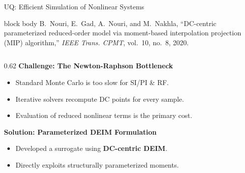 

\begin{frame}[t]{UQ: Efficient Simulation of Nonlinear Systems}
	\vspace{1ex}

	\begin{beamercolorbox}[wd=\textwidth, sep=1ex, rounded=true]{block body}
		\scriptsize B.~Nouri, E.~Gad, A.~Nouri, and M.~Nakhla, ``DC-centric parameterized reduced-order model via moment-based interpolation projection (MIP) algorithm,'' \emph{IEEE Trans. CPMT}, vol.~10, no.~8, 2020.
	\end{beamercolorbox}

	\vspace{2ex}

	\begin{columns}[T, onlytextwidth]
		\begin{column}{0.62\textwidth}
			\small
			\textbf{\textcolor{blue!80!black}{Challenge: The Newton-Raphson Bottleneck}}
			\begin{itemize}
				\item Standard Monte Carlo is too slow for SI/PI \& RF.
				\item Iterative solvers recompute DC points for every sample.
				\item Evaluation of reduced nonlinear terms is the primary cost.
			\end{itemize}

			\vspace{2ex}
			\textbf{\textcolor{blue!80!black}{Solution: Parameterized DEIM Formulation}}
			\begin{itemize}
				\item Developed a surrogate using \textbf{DC-centric DEIM}.
				\item Directly exploits structurally parameterized moments.
			\end{itemize}
		\end{column}


\end{columns}
\end{frame}
